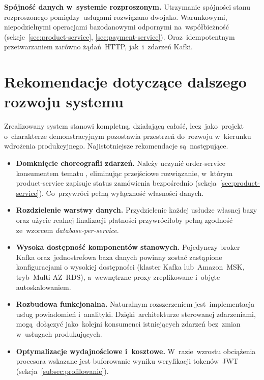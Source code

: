 \textbf{Spójność danych w~systemie rozproszonym.} Utrzymanie spójności stanu rozproszonego pomiędzy~usługami
rozwiązano dwojako. Warunkowymi, niepodzielnymi operacjami bazodanowymi odpornymi na~współbieżność (sekcje~\ref{sec:product-service},
\ref{sec:payment-service}). Oraz~idempotentnym przetwarzaniem zarówno żądań~HTTP, jak~i~zdarzeń Kafki.

\section*{Rekomendacje dotyczące dalszego rozwoju systemu}
{}
\label{sec:rekomendacje-rozwoju}

Zrealizowany system stanowi kompletną, działającą całość, lecz~jako~projekt o~charakterze demonstracyjnym pozostawia
przestrzeń do~rozwoju w~kierunku wdrożenia produkcyjnego. Najistotniejsze rekomendacje są~następujące.

\begin{itemize}
    \item \textbf{Domknięcie choreografii zdarzeń.} Należy uczynić order-service konsumentem tematu
    , eliminując przejściowe rozwiązanie, w~którym product-service zapisuje status zamówienia
    bezpośrednio (sekcja~\ref{sec:product-service}). Co~przywróci pełną wyłączność własności danych.

    \item \textbf{Rozdzielenie warstwy danych.} Przydzielenie każdej usłudze własnej bazy oraz użycie realnej
     finalizacji płatności przywróciłoby pełną zgodność ze~wzorcem \emph{database-per-service}.

    \item \textbf{Wysoka dostępność komponentów stanowych.} Pojedynczy broker Kafka oraz~jednostrefowa baza danych
    powinny zostać zastąpione konfiguracjami o wysokiej dostępności (klaster Kafka lub~Amazon~MSK, tryb~Multi-AZ~RDS),
    a~wewnętrzne proxy zreplikowane i~objęte autoskalowaniem.

    \item \textbf{Rozbudowa funkcjonalna.} Naturalnym rozszerzeniem jest~implementacja usług powiadomień
    i~analityki. Dzięki~architekturze sterowanej zdarzeniami, mogą~dołączyć jako~kolejni konsumenci
    istniejących zdarzeń bez~zmian w~usługach produkujących.

    \item \textbf{Optymalizacje wydajnościowe i~kosztowe.} W~razie~wzrostu obciążenia procesora wskazane jest
    buforowanie wyniku weryfikacji tokenów~JWT (sekcja~\ref{subsec:profilowanie}).
\end{itemize}

